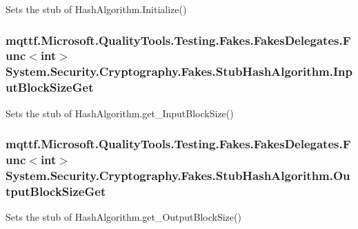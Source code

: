 Sets the stub of Hash\-Algorithm.\-Initialize()

\hypertarget{class_system_1_1_security_1_1_cryptography_1_1_fakes_1_1_stub_hash_algorithm_acc30931d252c0f01c11d95895871ca6e}{
\subsubsection[{Input\-Block\-Size\-Get}]{\setlength{\rightskip}{0pt plus 5cm}mqttf.\-Microsoft.\-Quality\-Tools.\-Testing.\-Fakes.\-Fakes\-Delegates.\-Func$<$int$>$ System.\-Security.\-Cryptography.\-Fakes.\-Stub\-Hash\-Algorithm.\-Input\-Block\-Size\-Get}}\label{class_system_1_1_security_1_1_cryptography_1_1_fakes_1_1_stub_hash_algorithm_acc30931d252c0f01c11d95895871ca6e}


Sets the stub of Hash\-Algorithm.\-get\-\_\-\-Input\-Block\-Size()

\hypertarget{class_system_1_1_security_1_1_cryptography_1_1_fakes_1_1_stub_hash_algorithm_a3e7a70d56bcf5e83b4d0224268e612df}{
\subsubsection[{Output\-Block\-Size\-Get}]{\setlength{\rightskip}{0pt plus 5cm}mqttf.\-Microsoft.\-Quality\-Tools.\-Testing.\-Fakes.\-Fakes\-Delegates.\-Func$<$int$>$ System.\-Security.\-Cryptography.\-Fakes.\-Stub\-Hash\-Algorithm.\-Output\-Block\-Size\-Get}}\label{class_system_1_1_security_1_1_cryptography_1_1_fakes_1_1_stub_hash_algorithm_a3e7a70d56bcf5e83b4d0224268e612df}


Sets the stub of Hash\-Algorithm.\-get\-\_\-\-Output\-Block\-Size()



